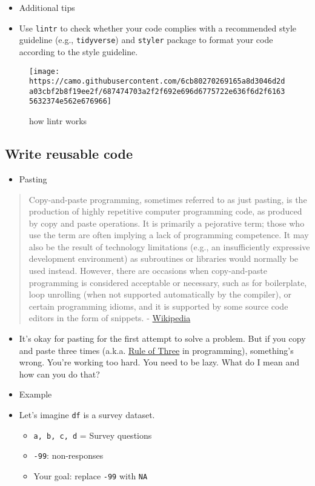 \documentclass[
]{book}
\providecommand{\tightlist}{%
  \setlength{\itemsep}{0pt}\setlength{\parskip}{0pt}}
\begin{document}
\begin{itemize}
\item
  Additional tips
\item
  Use \texttt{lintr} to check whether your code complies with a recommended style guideline (e.g., \texttt{tidyverse}) and \texttt{styler} package to format your code according to the style guideline.
\end{itemize}

\begin{figure}
\centering
\texttt{[image: https://camo.githubusercontent.com/6cb80270269165a8d3046d2da03cbf2b8f19ee2f/687474703a2f2f692e696d6775722e636f6d2f61635632374e562e676966]}
\caption{how lintr works}
\end{figure}

\hypertarget{write-reusable-code}{%
\subsection{Write reusable code}\label{write-reusable-code}}

\begin{itemize}
\tightlist
\item
  Pasting
\end{itemize}

\begin{quote}
Copy-and-paste programming, sometimes referred to as just pasting, is the production of highly repetitive computer programming code, as produced by copy and paste operations. It is primarily a pejorative term; those who use the term are often implying a lack of programming competence. It may also be the result of technology limitations (e.g., an insufficiently expressive development environment) as subroutines or libraries would normally be used instead. However, there are occasions when copy-and-paste programming is considered acceptable or necessary, such as for boilerplate, loop unrolling (when not supported automatically by the compiler), or certain programming idioms, and it is supported by some source code editors in the form of snippets. - \href{https://en.wikipedia.org/wiki/Copy-and-paste_programming}{Wikipedia}
\end{quote}

\begin{itemize}
\item
  It's okay for pasting for the first attempt to solve a problem. But if you copy and paste three times (a.k.a. \href{https://en.wikipedia.org/wiki/Rule_of_three_(computer_programming)}{Rule of Three} in programming), something's wrong. You're working too hard. You need to be lazy. What do I mean and how can you do that?
\item
  Example
\item
  Let's imagine \texttt{df} is a survey dataset.

  \begin{itemize}
  \item
    \texttt{a,\ b,\ c,\ d} = Survey questions
  \item
    \texttt{-99}: non-responses
  \item
    Your goal: replace \texttt{-99} with \texttt{NA}
  \end{itemize}
\end{itemize}
\end{document}
